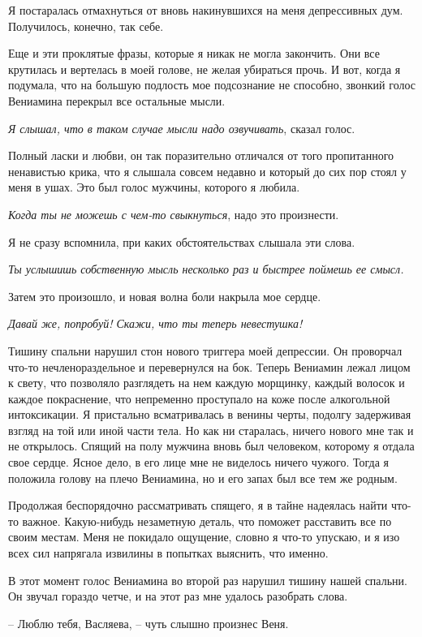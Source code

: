 \documentclass[
]{book}
\begin{document}
Я постаралась отмахнуться от вновь накинувшихся на меня депрессивных дум. Получилось, конечно, так себе.

Еще и эти проклятые фразы, которые я никак не могла закончить. Они все крутилась и вертелась в моей голове, не желая убираться прочь. И вот, когда я подумала, что на большую подлость мое подсознание не способно, звонкий голос Вениамина перекрыл все остальные мысли.

\emph{Я слышал, что в таком случае мысли надо озвучивать}, сказал голос.

Полный ласки и любви, он так поразительно отличался от того пропитанного ненавистью крика, что я слышала совсем недавно и который до сих пор стоял у меня в ушах. Это был голос мужчины, которого я любила.

\emph{Когда ты не можешь с чем-то свыкнуться}, надо это произнести.

Я не сразу вспомнила, при каких обстоятельствах слышала эти слова.

\emph{Ты услышишь собственную мысль несколько раз и быстрее поймешь ее смысл.}

Затем это произошло, и новая волна боли накрыла мое сердце.

\emph{Давай же, попробуй! Скажи, что ты теперь невестушка!}

Тишину спальни нарушил стон нового триггера моей депрессии. Он проворчал что-то нечленораздельное и перевернулся на бок. Теперь Вениамин лежал лицом к свету, что позволяло разглядеть на нем каждую морщинку, каждый волосок и каждое покраснение, что непременно проступало на коже после алкогольной интоксикации. Я пристально всматривалась в венины черты, подолгу задерживая взгляд на той или иной части тела. Но как ни старалась, ничего нового мне так и не открылось. Спящий на полу мужчина вновь был человеком, которому я отдала свое сердце. Ясное дело, в его лице мне не виделось ничего чужого. Тогда я положила голову на плечо Вениамина, но и его запах был все тем же родным.

Продолжая беспорядочно рассматривать спящего, я в тайне надеялась найти что-то важное. Какую-нибудь незаметную деталь, что поможет расставить все по своим местам. Меня не покидало ощущение, словно я что-то упускаю, и я изо всех сил напрягала извилины в попытках выяснить, что именно.

В этот момент голос Вениамина во второй раз нарушил тишину нашей спальни. Он звучал гораздо четче, и на этот раз мне удалось разобрать слова.

-- Люблю тебя, Васляева, -- чуть слышно произнес Веня.
\end{document}
